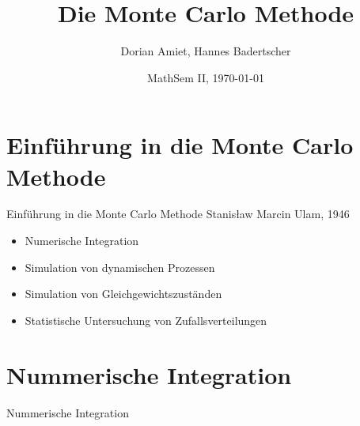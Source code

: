\documentclass{beamer}
\title{Die Monte Carlo Methode}
\author[Amiet, Badertscher]{Dorian Amiet, Hannes Badertscher}
\date [MathSem II, FS14]{MathSem II, \today}
\begin{document}
\begin{frame}
	\titlepage
\end{frame}
	
\section[Einführung]{Einführung in die Monte Carlo Methode}
\begin{frame}{Einführung in die Monte Carlo Methode}
	Stanisław Marcin Ulam, 1946 
	\begin{itemize}
	\item<1-> Numerische Integration
	\item<1-> Simulation von dynamischen Prozessen
	\item<1-> Simulation von Gleichgewichtszuständen
	\item<1-> Statistische Untersuchung von Zufallsverteilungen
	\end{itemize}
\end{frame}

\section{Nummerische Integration}
\begin{frame}{Nummerische Integration}
\end{frame}
\end{document}
